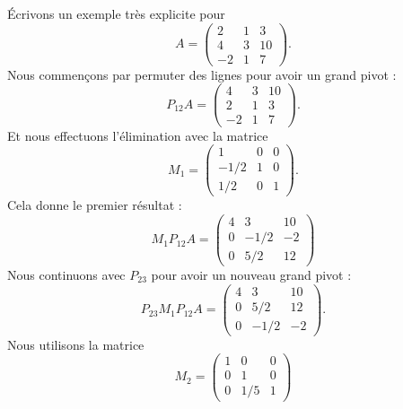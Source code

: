 Écrivons un exemple très explicite pour
\begin{equation}
    A=\begin{pmatrix}
        2    &   1    &   3    \\
        4    &   3    &   10    \\
        -2    &   1    &   7
    \end{pmatrix}.
\end{equation}
Nous commençons par permuter des lignes pour avoir un grand pivot :
\begin{equation}
    P_{12}A=\begin{pmatrix}
        4    &   3    &   10    \\
        2    &   1    &   3    \\
        -2    &   1    &   7
    \end{pmatrix}.
\end{equation}
Et nous effectuons l'élimination avec la matrice
\begin{equation}
    M_1=\begin{pmatrix}
        1    &   0    &   0    \\
        -1/2    &   1    &   0    \\
        1/2    &   0    &   1
    \end{pmatrix}.
\end{equation}
Cela donne le premier résultat :
\begin{equation}        \label{EQooKTBLooHeOkgk}
    M_1P_{12}A=\begin{pmatrix}
        4    &   3    &   10    \\
        0    &   -1/2    &   -2    \\
        0    &   5/2    &   12
    \end{pmatrix}
\end{equation}
Nous continuons avec \( P_{23}\) pour avoir un nouveau grand pivot :
\begin{equation}
    P_{23}M_1P_{12}A=\begin{pmatrix}
        4    &   3    &   10    \\
        0    &   5/2    &   12\\
        0    &   -1/2    &   -2
    \end{pmatrix}.
\end{equation}
Nous utilisons la matrice
\begin{equation}
    M_2=\begin{pmatrix}
        1    &   0    &   0    \\
        0    &   1    &   0    \\
        0    &   1/5    &   1
    \end{pmatrix}
\end{equation}
